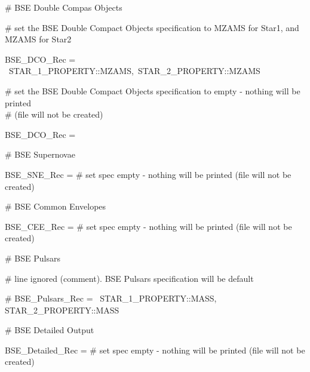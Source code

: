\medskip
\# BSE Double Compas Objects

\# set the BSE Double Compact Objects specification to MZAMS for Star1, and MZAMS for Star2

BSE\_DCO\_Rec = \lcb\ STAR\_1\_PROPERTY::MZAMS,\ STAR\_2\_PROPERTY::MZAMS\ \rcb           

\# set the BSE Double Compact Objects specification to empty - nothing will be printed \\
\# (file will not be created)

BSE\_DCO\_Rec = \lcb\rcb                                                        

\medskip
\# BSE Supernovae

BSE\_SNE\_Rec = \lcb\rcb\tabto{12em}\# set spec empty - nothing will be printed (file will not be created)                                                        

\medskip
\# BSE Common Envelopes

BSE\_CEE\_Rec = \lcb\rcb\tabto{12em}\# set spec empty - nothing will be printed (file will not be created)                                                        

\medskip
\# BSE Pulsars

\# line ignored (comment).  BSE Pulsars specification will be default

\# BSE\_Pulsars\_Rec = \lcb\ STAR\_1\_PROPERTY::MASS, STAR\_2\_PROPERTY::MASS\ \rcb     

\medskip
\# BSE Detailed Output

BSE\_Detailed\_Rec = \lcb\rcb\tabto{12em}\# set spec empty - nothing will be printed (file will not be created)                                                 
